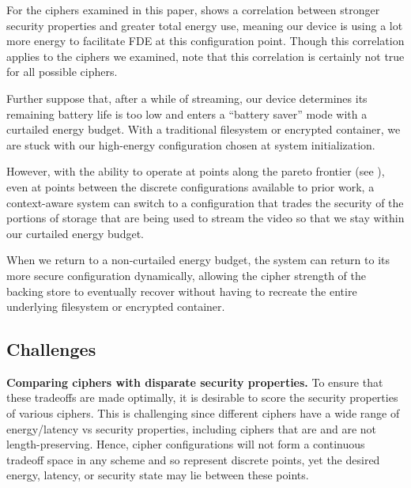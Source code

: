 For the ciphers examined in this paper,  shows
a correlation between stronger security properties and greater total energy use,
meaning our device is using a lot more energy to facilitate FDE at this
configuration point. Though this correlation applies to the ciphers we examined,
note that this correlation is certainly not true for all possible ciphers.

Further suppose that, after a while of streaming, our device determines its
remaining battery life is too low and enters a ``battery saver'' mode with a
curtailed energy budget. With a traditional filesystem or encrypted container,
we are stuck with our high-energy configuration chosen at system initialization.

However, with the ability to operate at points along the pareto frontier (see
), even at points between the discrete configurations
available to prior work, a context-aware system can switch to a configuration
that trades the security of the portions of storage that are being used to
stream the video so that we stay within our curtailed energy budget.

When we return to a non-curtailed energy budget, the system can return to its
more secure configuration dynamically, allowing the cipher strength of the
backing store to eventually recover without having to recreate the entire
underlying filesystem or encrypted container.


\subsection{Challenges}

\textbf{Comparing ciphers with disparate security properties.} To ensure that
these tradeoffs are made optimally, it is desirable to score the security
properties of various ciphers. This is challenging since different ciphers have
a wide range of energy/latency vs security properties, including ciphers that
are and are not length-preserving. Hence, cipher configurations will not form a
continuous tradeoff space in any scheme and so represent discrete points, yet
the desired energy, latency, or security state may lie between these points.

